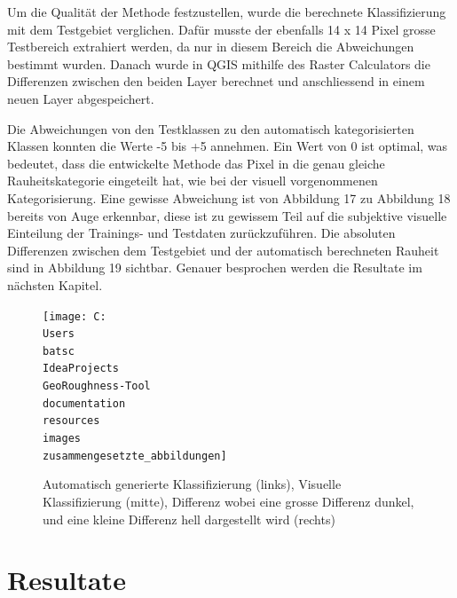 \documentclass[12pt]{article}
\begin{document}
        Um die Qualität der Methode festzustellen, wurde die berechnete Klassifizierung mit dem Testgebiet verglichen.
        Dafür musste der ebenfalls 14 x 14 Pixel grosse Testbereich extrahiert werden, da nur in diesem Bereich die Abweichungen bestimmt wurden.
        Danach wurde in QGIS mithilfe des Raster Calculators die Differenzen zwischen den beiden Layer berechnet und anschliessend in einem neuen Layer abgespeichert.

        Die Abweichungen von den Testklassen zu den automatisch kategorisierten Klassen konnten die Werte -5 bis +5 annehmen.
        Ein Wert von 0 ist optimal, was bedeutet, dass die entwickelte Methode das Pixel in die genau gleiche Rauheitskategorie eingeteilt hat, wie bei der visuell vorgenommenen Kategorisierung.
        Eine gewisse Abweichung ist von Abbildung 17 zu Abbildung 18 bereits von Auge erkennbar, diese ist zu gewissem Teil auf die subjektive visuelle Einteilung der Trainings- und Testdaten zurückzuführen. %
        Die absoluten Differenzen zwischen dem Testgebiet und der automatisch berechneten Rauheit sind in Abbildung 19 sichtbar. %
        Genauer besprochen werden die Resultate im nächsten Kapitel.

        \begin{figure}
            \centering
            \texttt{[image: C:\\Users\\batsc\\IdeaProjects\\GeoRoughness-Tool\\documentation\\resources\\images\\zusammengesetzte\_abbildungen]}
            \caption{Automatisch generierte Klassifizierung (links), Visuelle Klassifizierung (mitte), Differenz wobei eine grosse Differenz dunkel, und eine kleine Differenz hell dargestellt wird (rechts)}
            \label{fig:zusammengesetzte_abbildungen}
        \end{figure}

\section{Resultate}\label{sec:resultate}
\end{document}
